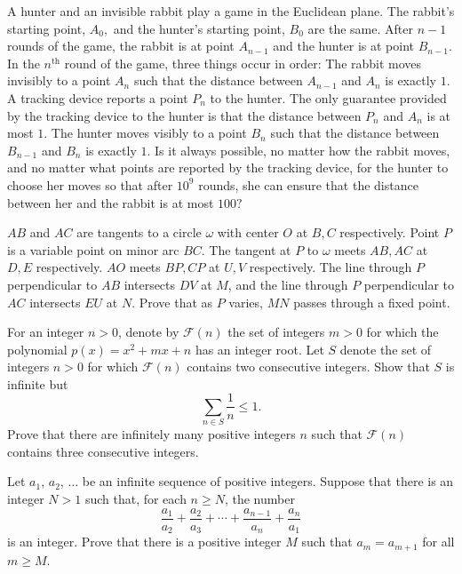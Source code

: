 \documentclass[11pt]{scrartcl}
\begin{document}
\begin{problem}[3333337471825030029]
A hunter and an invisible rabbit play a game in the Euclidean plane. The rabbit's starting point, $A_0,$ and the hunter's starting point, $B_0$ are the same. After $n-1$ rounds of the game, the rabbit is at point $A_{n-1}$ and the hunter is at point $B_{n-1}.$ In the $n^{\text{th}}$ round of the game, three things occur in order:
The rabbit moves invisibly to a point $A_n$ such that the distance between $A_{n-1}$ and $A_n$ is exactly $1.$
A tracking device reports a point $P_n$ to the hunter. The only guarantee provided by the tracking device to the hunter is that the distance between $P_n$ and $A_n$ is at most $1.$
The hunter moves visibly to a point $B_n$ such that the distance between $B_{n-1}$ and $B_n$ is exactly $1.$
Is it always possible, no matter how the rabbit moves, and no matter what points are reported by the tracking device, for the hunter to choose her moves so that after $10^9$ rounds, she can ensure that the distance between her and the rabbit is at most $100?$
\end{problem}
\begin{problem}[733773583946080]
$AB$ and $AC$ are tangents to a circle $\omega$ with center $O$ at $B,C$ respectively. Point $P$ is a variable point on minor arc $BC$. The tangent at $P$ to $\omega$ meets $AB,AC$ at $D,E$ respectively. $AO$ meets $BP,CP$ at $U,V$ respectively. The line through $P$ perpendicular to $AB$ intersects $DV$ at $M$, and the line through $P$ perpendicular to $AC$ intersects $EU$ at $N$. Prove that as $P$ varies, $MN$ passes through a fixed point.
\end{problem}
\begin{problem}[69707766974981]
For an integer $n > 0$, denote by $\mathcal F(n)$ the set of integers $m > 0$ for which the polynomial $p(x) = x^2 + mx + n$ has an integer root.
Let $S$ denote the set of integers $n > 0$ for which $\mathcal F(n)$ contains two consecutive integers. Show that $S$ is infinite but\[ \sum_{n \in S} \frac 1n \le 1. \]
Prove that there are infinitely many positive integers $n$ such that $\mathcal F(n)$ contains three consecutive integers.
\end{problem}
\begin{problem}[402654566950359]
Let $a_1$, $a_2$, $\ldots$ be an infinite sequence of positive integers. Suppose that there is an integer $N > 1$ such that, for each $n \geq N$, the number
$$\frac{a_1}{a_2} + \frac{a_2}{a_3} + \cdots + \frac{a_{n-1}}{a_n} + \frac{a_n}{a_1}$$is an integer. Prove that there is a positive integer $M$ such that $a_m = a_{m+1}$ for all $m \geq M$.
\end{problem}
\end{document}

